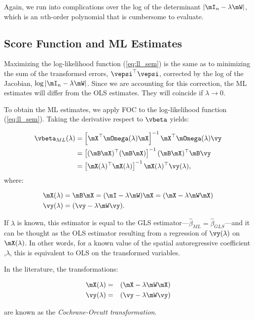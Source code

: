 \documentclass[english,12pt]{book}\usepackage[]{graphicx}\usepackage[]{xcolor}
\begin{document}
Again, we run into complications over the log of the determinant $\left|\mI_n - \lambda \mW\right|$, which is an $n$th-order polynomial that is cumbersome to evaluate. 

\subsection{Score Function and ML Estimates}\label{sec:sem_ml_estimates}

Maximizing the log-likelihood function (\ref{eq:ll_sem}) is the same as to minimizing the sum of the transformed errors, $\vepsi^\top\vepsi$, corrected by the log of the Jacobian, $\log\left|\mI_n - \lambda \mW\right|$. Since we are accounting for this correction, the ML estimates will differ from the OLS estimates. They will coincide if $\lambda \to 0$. 

To obtain the ML estimates, we apply FOC to the log-likelihood function (\ref{eq:ll_sem}). Taking the derivative respect to $\vbeta$ yields:

\begin{equation}\label{eq:beta_gls_ml}
  \begin{aligned}
\vbeta_{ML}(\lambda) & =\left[\mX^\top\mOmega(\lambda)\mX\right]^{-1}\mX^\top\mOmega(\lambda)\vy\\
                     & = \left[(\mB\mX)^\top (\mB \mX)\right]^{-1} (\mB\mX)^\top \mB \vy \\
                     & = \left[\mX(\lambda)^\top  \mX(\lambda)\right]^{-1} \mX(\lambda)^\top \vy(\lambda),
  \end{aligned}
\end{equation}
%
where:

\begin{equation}
  \begin{aligned}
\mX(\lambda) & = \mB\mX = (\mI - \lambda\mW)\mX = (\mX - \lambda\mW\mX) \\
\vy(\lambda) & = (\vy - \lambda \mW \vy).
  \end{aligned}
\end{equation}

If $\lambda$ is known, this estimator is equal to the GLS estimator---$\widehat{\beta}_{ML} = \widehat{\beta}_{GLS}$---and it can be thought as the OLS estimator resulting from a regression of $\vy(\lambda)$ on $\mX(\lambda)$. In other words, for a known value of the spatial autoregressive coefficient ,$\lambda$, this is equivalent to OLS on the transformed variables.


\begin{remark}
In the literature, the transformations:

\begin{eqnarray*}
\mX(\lambda) &=&(\mX - \lambda\mW\mX) \\
\vy(\lambda) &=& (\vy - \lambda \mW \vy)
\end{eqnarray*}

are known as the \emph{Cochrane-Orcutt transformation}.
\end{remark}
\end{document}
